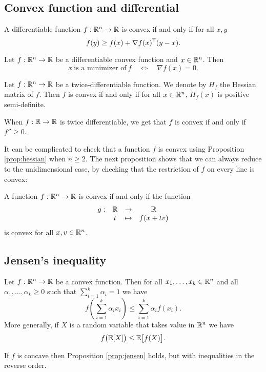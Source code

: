 \documentclass[11pt,nocut]{article}
\begin{document}
\subsection{Convex function and differential}

\begin{proposition}
	A differentiable function $f: \mathbb{R}^n \to \mathbb{R}$ is convex if and only if for all $x,y$
	$$
	f(y) \geq f(x) + \nabla f(x)^{{\sf T}} (y-x).
	$$
\end{proposition}

\begin{corollary}
	Let $f: \mathbb{R}^n \to \mathbb{R}$ be a differentiable convex function and $x \in \mathbb{R}^n$. Then
	$$
	x \ \text{is a minimizer of} \ f
	\quad \Longleftrightarrow \quad \nabla f(x) = 0.
	$$
\end{corollary}

\begin{proposition}\label{prop:hessian}
	Let $f: \mathbb{R}^n \to \mathbb{R}$ be a twice-differentiable function. We denote by $H_f$ the Hessian matrix of $f$.
	Then $f$ is convex if and only if for all $x \in \mathbb{R}^n$, $H_f(x)$ is positive semi-definite.
\end{proposition}
When $f: \mathbb{R} \to \mathbb{R}$ is twice differentiable, we get that $f$ is convex if and only if $f'' \geq 0$.

It can be complicated to check that a function $f$ is convex using Proposition \ref{prop:hessian} when $n \geq 2$. The next proposition shows that we can always reduce to the unidimensional case, by checking that the restriction of $f$ on every line is convex:

\begin{proposition}
	A function $f: \mathbb{R}^n \to \mathbb{R}$ is convex if and only if the function
	$$
	\begin{array}{rccc}
		g: & \mathbb{R} & \to & \mathbb{R} \\
		   & t & \mapsto & f(x+t v)
	\end{array}
	$$
	is convex for all $x,v \in \mathbb{R}^n$.
\end{proposition}

\subsection{Jensen's inequality}

\begin{proposition}\label{prop:jensen}
	Let $f: \mathbb{R}^n \to \mathbb{R}$ be a convex function. Then for all $x_1, \dots, x_k \in \mathbb{R}^n$ and all $\alpha_1, \dots, \alpha_k \geq 0$ such that $\sum_{i=1}^k \alpha_i = 1$ we have
	$$
	f\left(\sum_{i=1}^k \alpha_i x_i \right) \leq \sum_{i=1}^k \alpha_i f(x_i).
	$$
	More generally, if $X$ is a random variable that takes value in $\mathbb{R}^n$ we have
	$$
	f\big(\mathbb{E} [X]\big) \leq \mathbb{E} \big[f(X)\big].
	$$
\end{proposition}
\begin{remark}
	If $f$ is concave then Proposition \ref{prop:jensen} holds, but with inequalities in the reverse order.
\end{remark}
\end{document}
